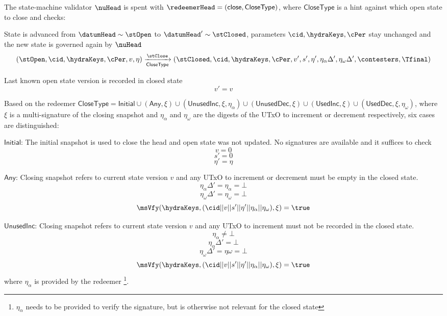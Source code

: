 \noindent The state-machine validator $\nuHead$ is spent with
$\redeemerHead = (\mathsf{close}, \mathsf{CloseType})$, where
$\mathsf{CloseType}$ is a hint against which open state to close and checks:
\begin{menumerate}
  \item State is advanced from $\datumHead \sim \stOpen$ to
  $\datumHead' \sim \stClosed$, parameters $\cid,\hydraKeys,\cPer$
  stay unchanged and the new state is governed again by $\nuHead$
  \[
	(\stOpen,\cid,\hydraKeys,\cPer,v,\eta) \xrightarrow[\mathsf{CloseType}]{\stClose} (\stClosed,\cid,\hydraKeys,\cPer,v',s',\eta', \eta_\alpha\Delta', \eta_\omega\Delta', \contesters,\Tfinal)
  \]
  \item Last known open state version is recorded in closed state
  \[
	v' = v
  \]

  \item Based on the redeemer $\mathsf{CloseType} = \mathsf{Initial} \cup (\mathsf{Any}, \xi) \cup (\mathsf{UnusedInc}, \xi, \eta_\alpha) \cup (\mathsf{UnusedDec}, \xi) \cup (\mathsf{UsedInc}, \xi)  \cup (\mathsf{UsedDec}, \xi, \eta_\omega) $, where $\xi$ is a multi-signature of the closing snapshot and $\eta_\alpha$ and $\eta_\omega$ are the digests of the UTxO to increment or decrement respectively, six cases are distinguished:
  \begin{menumerate}
	\item $\mathsf{Initial}$: The initial snapshot is used to close the head and open state was not updated. No signatures are available and it suffices to check
	\[
	  v = 0
	\]
	\[
	  s' = 0
	\]
	\[
	  \eta' = \eta
	\]
    \item $\mathsf{Any}$: Closing snapshot refers to current state version $v$ and any UTxO to increment or decrement must be empty in the closed state.
	  \[
		\eta_\alpha\Delta' = \eta_\alpha = \bot
	  \]
	  \[
		\eta_\omega\Delta' = \eta_\omega = \bot
	  \]
	  \[
		\msVfy(\hydraKeys,(\cid || v || s' || \eta' || \eta_\alpha || \eta_\omega),\xi) = \true
	  \]
	  \item $\mathsf{UnusedInc}$: Closing snapshot refers to current state version $v$ and any UTxO to increment must not be recorded in the closed state.
	  \[
	    \eta_\alpha  \neq \bot
	  \]
	  \[
	    \eta_\alpha\Delta' = \bot
	  \]
	  \[
		\eta_\omega\Delta' = \eta\omega = \bot
	  \]
	  \[
		\msVfy(\hydraKeys,(\cid || v || s' || \eta' || \eta_\alpha || \eta_\omega),\xi) = \true
	  \]
	  where $\eta_\alpha$ is provided by the redeemer \footnote{$\eta_\alpha$ needs to be provided to verify the signature, but is otherwise not relevant for the closed state}.

\end{menumerate}
\end{menumerate}
